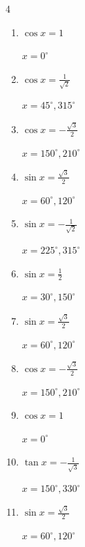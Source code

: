 \begin{multicols}{4}
\begin{enumerate}
        $\displaystyle x = 90^{\circ}$

  \item $\displaystyle \cos{x}  = 1$

        $\displaystyle x = 0^{\circ}$

  \item $\displaystyle \cos{x}  = \frac{1}{\sqrt{2}}$

        $\displaystyle x = 45^{\circ} , 315^{\circ}$

  \item $\displaystyle \cos{x}  = -\frac{\sqrt{3}}{2}$

        $\displaystyle x = 150^{\circ} , 210^{\circ}$

  \item $\displaystyle \sin{x}  = \frac{\sqrt{3}}{2}$

        $\displaystyle x = 60^{\circ} , 120^{\circ}$

  \item $\displaystyle \sin{x}  = -\frac{1}{\sqrt{2}}$

        $\displaystyle x = 225^{\circ} , 315^{\circ}$

  \item $\displaystyle \sin{x}  = \frac{1}{2}$

        $\displaystyle x = 30^{\circ} , 150^{\circ}$

  \item $\displaystyle \sin{x}  = \frac{\sqrt{3}}{2}$

        $\displaystyle x = 60^{\circ} , 120^{\circ}$

\columnbreak %

\resetques

  \item $\displaystyle \cos{x}  = -\frac{\sqrt{3}}{2}$

        $\displaystyle x = 150^{\circ} , 210^{\circ}$

  \item $\displaystyle \cos{x}  = 1$

        $\displaystyle x = 0^{\circ}$

  \item $\displaystyle \tan{x}  = -\frac{1}{\sqrt{3}}$

        $\displaystyle x = 150^{\circ} , 330^{\circ}$

  \item $\displaystyle \sin{x}  = \frac{\sqrt{3}}{2}$

        $\displaystyle x = 60^{\circ} , 120^{\circ}$


\end{enumerate}
\end{multicols}
